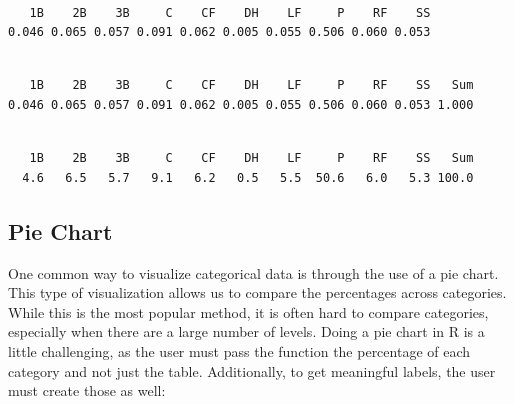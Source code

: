 \documentclass[
  letterpaper,
  DIV=11,
  numbers=noendperiod]{scrreprt}
\newenvironment{Shaded}{\begin{snugshade}}{\end{snugshade}}
\newcommand{\DecValTok}[1]{\textcolor[rgb]{0.68,0.00,0.00}{#1}}
\newcommand{\FunctionTok}[1]{\textcolor[rgb]{0.28,0.35,0.67}{#1}}
\newcommand{\NormalTok}[1]{\textcolor[rgb]{0.00,0.23,0.31}{#1}}
\newcommand{\SpecialCharTok}[1]{\textcolor[rgb]{0.37,0.37,0.37}{#1}}
\begin{document}
\begin{verbatim}

   1B    2B    3B     C    CF    DH    LF     P    RF    SS 
0.046 0.065 0.057 0.091 0.062 0.005 0.055 0.506 0.060 0.053 
\end{verbatim}

\begin{Shaded}
\end{Shaded}

\begin{verbatim}

   1B    2B    3B     C    CF    DH    LF     P    RF    SS   Sum 
0.046 0.065 0.057 0.091 0.062 0.005 0.055 0.506 0.060 0.053 1.000 
\end{verbatim}

\begin{Shaded}
\end{Shaded}

\begin{verbatim}

   1B    2B    3B     C    CF    DH    LF     P    RF    SS   Sum 
  4.6   6.5   5.7   9.1   6.2   0.5   5.5  50.6   6.0   5.3 100.0 
\end{verbatim}

\subsection{Pie Chart}\label{pie-chart}

One common way to visualize categorical data is through the use of a pie
chart. This type of visualization allows us to compare the percentages
across categories. While this is the most popular method, it is often
hard to compare categories, especially when there are a large number of
levels. Doing a pie chart in R is a little challenging, as the user must
pass the function the percentage of each category and not just the
table. Additionally, to get meaningful labels, the user must create
those as well:
\end{document}
